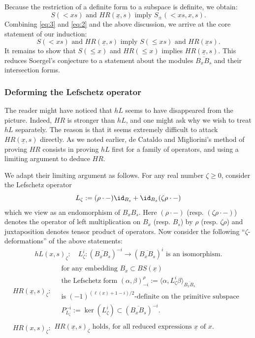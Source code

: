 \documentclass[11pt]{amsart}
\numberwithin{equation}{section}
\def\a{\alpha}
\def\b{\beta}
\def\z{\zeta}
\def\ov{\overline}
\def\un{\underline}
\def\to{\rightarrow}
\theoremstyle{definition}
\theoremstyle{remark}
\begin{document}
Because the restriction of a definite form to a subspace is definite,
we obtain:
\begin{equation}
  \label{eq:3}
  \text{$S(<\!xs)$ and $HR(\un{x},s)$ imply $S_{\pm}(<\!xs,x,s)$.}
\end{equation}
Combining \eqref{eq:3} and \eqref{eq:2} and the above discussion, we
arrive at the core statement of our induction:
\begin{equation}
  \label{eq:core}
  \text{$S(<\!xs)$ and $HR(\un{x},s)$ imply $S(\le \!xs)$ and $HR(\un{x} s)$.}
\end{equation}
It remains to show that $S(\le\!x)$ and $HR(\le\!x)$ implies $HR(\un{x},s)$. This reduces Soergel's conjecture to a  statement about the
modules $\ov{B_xB_s}$ and their intersection forms. 

\subsubsection{Deforming the Lefschetz operator} \label{sc:la}
The reader might have noticed that $hL$ seems to have disappeared from the
picture. Indeed, $HR$ is stronger than $hL$, and one might ask why we
wish to treat $hL$ separately. The reason is that it seems extremely
difficult to attack $HR(\un{x}, s)$ directly.  As we noted earlier, de Cataldo and Migliorini's
method of proving $HR$ consists in proving $hL$ first for a family of operators, and using a limiting argument to deduce $HR$.

We adapt their limiting argument as follows. For any real number $\z \ge 0$, consider the Lefschetz operator \[ L_\z := (\rho \cdot -) \id_{B_s} + \id_{B_x} (\z \rho \cdot-) \] which we view as an
endomorphism of $B_xB_s$. Here $(\rho \cdot - )$ (resp. $ (\zeta \rho \cdot -)$) denotes the operator of left multiplication on $B_x$ (resp. $B_s$) by $\rho$ (resp. $\z \rho$) and
juxtaposition denotes tensor product of operators. Now consider the
following ``$\z$-deformations'' of the above
statements:
\begin{gather*} hL(x,s)_\z: \quad \text{$L_\z^i : (\ov{B_xB_s})^{-i} \to
(\ov{B_xB_s})^i$ is an isomorphism.} \end{gather*} \begin{gather*}
HR(\un{x},s)_\z: \quad \begin{array}{c}  \text{for any embedding $B_x
    \subset BS(\un{x})$} \\
\text{the Lefschetz form $(\a, \b)_{-i}^\rho := \langle \a, L_\z^i \b \rangle_{\ov{B_x
B_s}}$}\\ \text{is $(-1)^{(\ell(x) + 1 - i)/2}$-definite on the
primitive subspace } \\ \text{} P^{-i}_{L_\z} := \ker (L_{\z}^i)
\subset (\ov{B_xB_s})^{-i}. \end{array}\\
  HR(x,s)_\z: \begin{array}{c}
\text{$HR(\un{x},s)_\z$ holds, for all reduced expressions $\un{x}$ of
  $x$.} \end{array}
\end{gather*}
\end{document}
